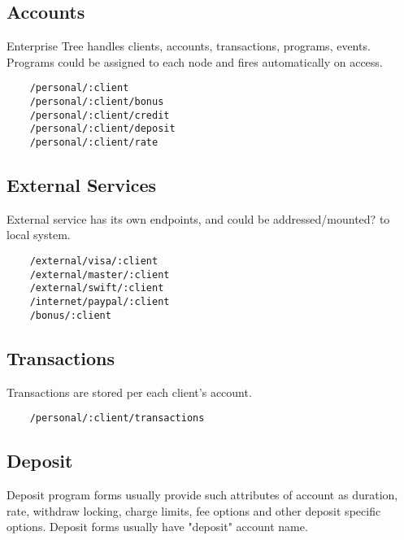 \subsection{Accounts}

Enterprise Tree handles clients, accounts, transactions, programs, events.
Programs could be assigned to each node and fires automatically on access.

\vspace{1\baselineskip}
\begin{lstlisting}
    /personal/:client
    /personal/:client/bonus
    /personal/:client/credit
    /personal/:client/deposit
    /personal/:client/rate
\end{lstlisting}
\vspace{1\baselineskip}

\subsection{External Services}

External service has its own endpoints, and could be
addressed/mounted? to local system.

\vspace{1\baselineskip}
\begin{lstlisting}
    /external/visa/:client
    /external/master/:client
    /external/swift/:client
    /internet/paypal/:client
    /bonus/:client
\end{lstlisting}
\vspace{1\baselineskip}

\subsection{Transactions}

Transactions are stored per each client's account.

\vspace{1\baselineskip}
\begin{lstlisting}
    /personal/:client/transactions
\end{lstlisting}
\vspace{1\baselineskip}

\subsection{Deposit}

Deposit program forms usually provide such attributes of
account as duration, rate, withdraw locking, charge
limits, fee options and other deposit specific options.
Deposit forms usually have "deposit" account name.


